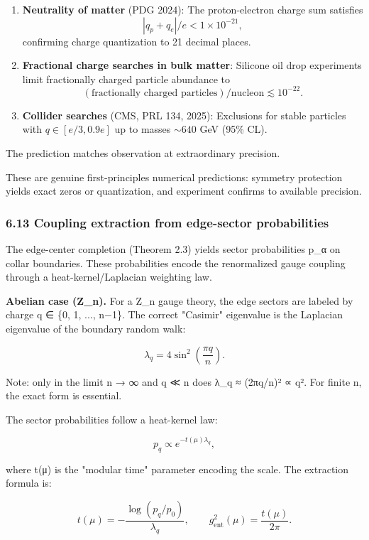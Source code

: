\begin{enumerate}
\def\labelenumi{\arabic{enumi}.}
\item
  \textbf{Neutrality of matter} (PDG 2024): The proton-electron charge sum satisfies \[|q_p + q_e|/e < 1 \times 10^{-21},\] confirming charge quantization to 21 decimal places.
\item
  \textbf{Fractional charge searches in bulk matter}: Silicone oil drop experiments limit fractionally charged particle abundance to \[(\text{fractionally charged particles})/\text{nucleon} \lesssim 10^{-22}.\]
\item
  \textbf{Collider searches} (CMS, PRL 134, 2025): Exclusions for stable particles with \(q \in [e/3, 0.9e]\) up to masses \(\sim 640\) GeV (95\% CL).
\end{enumerate}

The prediction matches observation at extraordinary precision.

These are genuine first-principles numerical predictions: symmetry protection yields exact zeros or quantization, and experiment confirms to available precision.

\subsubsection{6.13 Coupling extraction from edge-sector probabilities}\label{613-coupling-extraction-from-edge-sector-probabilities}

The edge-center completion (Theorem 2.3) yields sector probabilities p\_α on collar boundaries. These probabilities encode the renormalized gauge coupling through a heat-kernel/Laplacian weighting law.

\textbf{Abelian case (Z\_n).} For a Z\_n gauge theory, the edge sectors are labeled by charge q ∈ \{0, 1, ..., n−1\}. The correct "Casimir" eigenvalue is the Laplacian eigenvalue of the boundary random walk:

\[
\lambda_q = 4 \sin^2\left(\frac{\pi q}{n}\right).
\]

Note: only in the limit n → ∞ and q ≪ n does λ\_q ≈ (2πq/n)² ∝ q². For finite n, the exact form is essential.

The sector probabilities follow a heat-kernel law:

\[
p_q \propto e^{-t(\mu) \lambda_q},
\]

where t(μ) is the "modular time" parameter encoding the scale. The extraction formula is:

\[
t(\mu) = -\frac{\log(p_q/p_0)}{\lambda_q}, \qquad
g_{\mathrm{ent}}^2(\mu) = \frac{t(\mu)}{2\pi}.
\]

